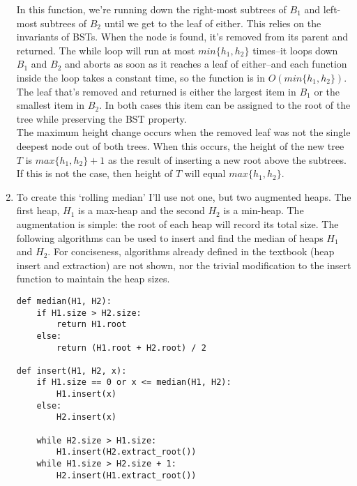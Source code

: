 \documentclass{article}
\begin{document}
\begin{enumerate}
    In this function, we're running down the right-most subtrees of $B_1$ and left-most subtrees of $B_2$ until we get to the leaf of either. This relies on the invariants of BSTs. When the node is found, it's removed from its parent and returned. The while loop will run at most $min\{h_1, h_2\}$ times--it loops down $B_1$ and $B_2$ and aborts as soon as it reaches a leaf of either--and each function inside the loop takes a constant time, so the function is in $O(min\{h_1, h_2\})$. \\

    The leaf that's removed and returned is either the largest item in $B_1$ or the smallest item in $B_2$. In both cases this item can be assigned to the root of the tree while preserving the BST property. \\

    The maximum height change occurs when the removed leaf was not the single deepest node out of both trees. When this occurs, the height of the new tree $T$ is $max\{h_1, h_2\} + 1$ as the result of inserting a new root above the subtrees. If this is not the case, then height of $T$ will equal $max\{h_1, h_2\}$.

\item To create this `rolling median' I'll use not one, but two augmented heaps. The first heap, $H_1$ is a max-heap and the second $H_2$ is a min-heap. The augmentation is simple: the root of each heap will record its total size. The following algorithms can be used to insert and find the median of heaps $H_1$ and $H_2$. For conciseness, algorithms already defined in the textbook (heap insert and extraction) are not shown, nor the trivial modification to the insert function to maintain the heap sizes.
\begin{lstlisting}
def median(H1, H2):
    if H1.size > H2.size:
        return H1.root
    else:
        return (H1.root + H2.root) / 2

def insert(H1, H2, x):
    if H1.size == 0 or x <= median(H1, H2):
        H1.insert(x)
    else:
        H2.insert(x)

    while H2.size > H1.size:
        H1.insert(H2.extract_root())
    while H1.size > H2.size + 1:
        H2.insert(H1.extract_root())
\end{lstlisting}
\end{enumerate}
\end{document}
